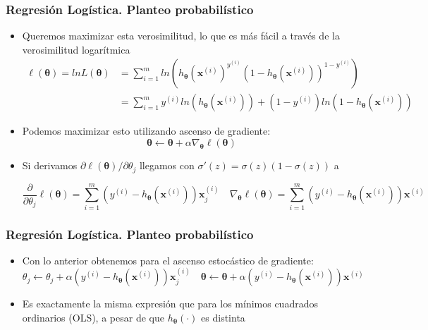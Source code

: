 \documentclass[10pt]{beamer}
\begin{document}
\begin{frame}
\frametitle{Regresión Logística. Planteo probabilístico}
\begin{itemize}
\item Queremos maximizar esta verosimilitud, lo que es más fácil a través de la verosimilitud logarítmica
\begin{equation*}
\begin{split}
\ell (\boldsymbol{\theta})= ln L(\boldsymbol{\theta}) & = \sum_{i=1}^{m} ln \left( h_{\boldsymbol{\theta}} (\boldsymbol{x}^{(i)})^{y^{(i)}}( 1- h_{\boldsymbol{\theta}} (\boldsymbol{x}^{(i)}))^{1-y^{(i)}} \right) \\
 & = \sum_{i=1}^{m} y^{(i)}ln \left( h_{\boldsymbol{\theta}}  (\boldsymbol{x}^{(i)})\right) + (1-y^{(i)}) ln ( 1- h_{\boldsymbol{\theta}} (\boldsymbol{x}^{(i)}))
\end{split} 
\end{equation*}
\item Podemos maximizar esto utilizando ascenso de gradiente:
\begin{equation*}
\boldsymbol{\theta} \leftarrow \boldsymbol{\theta} + \alpha \nabla_{\boldsymbol{\theta}} \ell (\boldsymbol{\theta})
\end{equation*}
\item Si derivamos $\partial \ell (\boldsymbol{\theta})/ \partial \theta_j$ llegamos con $\sigma ' (z)= \sigma(z)(1-\sigma(z))$ a

\begin{equation*}
\frac{\partial}{\partial \theta_j} \ell (\boldsymbol{\theta})= \sum_{i=1}^{m}  \left( y^{(i)}- h_{\boldsymbol{\theta}} (\boldsymbol{x}^{(i)}) \right) \boldsymbol{x}^{(i)}_{j} \quad  \nabla_{\boldsymbol{\theta}} \ell (\boldsymbol{\theta})=  \sum_{i=1}^{m} \left( y^{(i)}- h_{\boldsymbol{\theta}} (\boldsymbol{x}^{(i)}) \right) \boldsymbol{x}^{(i)}
\end{equation*}

\end{itemize}
\end{frame}

\begin{frame}
\frametitle{Regresión Logística. Planteo probabilístico}
\begin{itemize}
\item Con lo anterior obtenemos para el ascenso estocástico de gradiente:
\begin{equation*}
\theta_{j} \leftarrow \theta_{j} + \alpha \left( y^{(i)}- h_{\boldsymbol{\theta}} (\boldsymbol{x}^{(i)}) \right) \boldsymbol{x}^{(i)}_{j} \quad  \boldsymbol{\theta}\leftarrow \boldsymbol{\theta} + \alpha \left( y^{(i)}- h_{\boldsymbol{\theta}} (\boldsymbol{x}^{(i)}) \right) \boldsymbol{x}^{(i)}
\end{equation*}
\item  Es exactamente la misma expresión que para los mínimos cuadrados ordinarios (OLS), a pesar de que $ h_{\boldsymbol{\theta}}(\cdot)$ es distinta
\end{itemize}
\end{frame}
\end{document}
